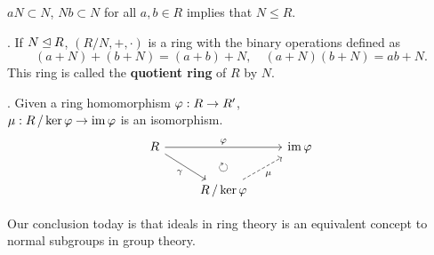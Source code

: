 \rmk \(aN \subset N\), \(Nb \subset N\) for all \(a, b \in R\) implies that \(N \leq R\).

.  If \(N \unlhd R\), \((R / N, +, \cdot)\) is a ring with the binary operations defined as
\[
    (a + N) + (b + N) = (a + b) + N, \quad (a + N)(b + N) = ab + N.
\]
This ring is called the \textbf{quotient ring} of \(R\) by \(N\).

\thm.  Given a ring homomorphism \(\varphi : R \rightarrow R'\),\\
\(\mu : R \operatorname{/} {\ker\varphi} \rightarrow \operatorname{im} \varphi\) is an isomorphism.
\[
    \begin{tikzcd}
        R \arrow{rr}{\varphi} \arrow[swap]{dr}{\gamma} & \arrow[d, phantom, "\circlearrowright"]& \im \varphi \\
        & R \quotient \ker\varphi \arrow[dashed,swap]{ur}{\mu} &
    \end{tikzcd}
\]

Our conclusion today is that ideals in ring theory is an equivalent concept to normal subgroups in group theory.

\pagebreak
